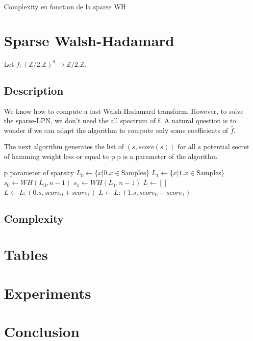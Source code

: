 \documentclass{llncs}		%
\begin{document}
Complexity en fonction de la sparse WH

\section{Sparse Walsh-Hadamard}
Let $f:(\mathbb{Z}/2.\mathbb{Z})^n \rightarrow \mathbb{Z}/2.\mathbb{Z}$.

\subsection{Description}
We know how to compute a fast Walsh-Hadamard transform.
However, to solve the sparse-LPN, we don't need the all spectrum of f. 
A natural question is to wonder if we can adapt the algorithm to compute only
some coefficients of $\hat{f}$. 

The next algorithm generates the list of $(s,score(s))$ for all $s$ potential secret of
hamming weight less or equal to p.p is a parameter of the algorithm.
\begin{framed}
\begin{algorithmic}
\State p parameter of sparsity
   \EndIf
\State $L_0 \gets \{x | 0.x \in \text{Samples} \}$
\State $L_1 \gets \{x | 1.x \in \text{Samples} \}$
\State $s_0 \gets WH(L_0,n-1)$ 
\State $s_1 \gets WH(L_1,n-1)$
\State$ L \gets []$
  \State $ L\gets L:(0.s, score_0 + score_1)    $
   $L\gets L: (1.s ,  score_0 - score_1)  $ \EndIf 
\EndFor
{}
\EndFunction
\end{algorithmic}
\end{framed}

\subsection{Complexity}

\section{Tables}

\section{Experiments}

\section{Conclusion}


%
%


%
 
\end{document}
